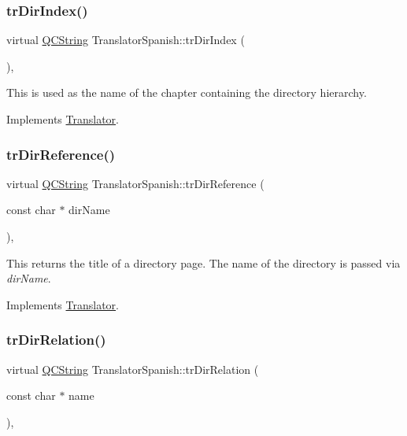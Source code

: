 \subsubsection{\texorpdfstring{trDirIndex()}{trDirIndex()}}
{\footnotesize\ttfamily virtual \mbox{\hyperlink{class_q_c_string}{Q\+C\+String}} Translator\+Spanish\+::tr\+Dir\+Index (\begin{DoxyParamCaption}{ }\end{DoxyParamCaption})\hspace{0.3cm}{\ttfamily [inline]}, {\ttfamily [virtual]}}

This is used as the name of the chapter containing the directory hierarchy. 

Implements \mbox{\hyperlink{class_translator}{Translator}}.

\mbox{\label{class_translator_spanish_ad9066cb7521ad27eedcd90d579f9e76e}} 
\subsubsection{\texorpdfstring{trDirReference()}{trDirReference()}}
{\footnotesize\ttfamily virtual \mbox{\hyperlink{class_q_c_string}{Q\+C\+String}} Translator\+Spanish\+::tr\+Dir\+Reference (\begin{DoxyParamCaption}\item[{const char $\ast$}]{dir\+Name }\end{DoxyParamCaption})\hspace{0.3cm}{\ttfamily [inline]}, {\ttfamily [virtual]}}

This returns the title of a directory page. The name of the directory is passed via {\itshape dir\+Name}. 

Implements \mbox{\hyperlink{class_translator}{Translator}}.

\mbox{\label{class_translator_spanish_af5482f25b685fb02c6885dd9d9d8b34f}} 
\subsubsection{\texorpdfstring{trDirRelation()}{trDirRelation()}}
{\footnotesize\ttfamily virtual \mbox{\hyperlink{class_q_c_string}{Q\+C\+String}} Translator\+Spanish\+::tr\+Dir\+Relation (\begin{DoxyParamCaption}\item[{const char $\ast$}]{name }\end{DoxyParamCaption})\hspace{0.3cm}{\ttfamily [inline]}, {\ttfamily [virtual]}}

